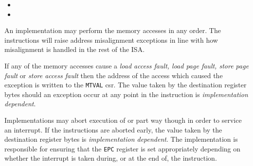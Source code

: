 \begin{minipage}{0.5\textwidth}
\begin{itemize}
\item {}
\item {}
\end{itemize}
\end{minipage}

\bigskip


An implementation may perform the memory accesses in any order. The instructions
will raise address misalignment exceptions in line with how misalignment is
handled in the rest of the ISA.

If any of the memory accesses cause
a {\em load access fault, load page fault, store page fault} or
{\em store access fault} then the address of the access which caused the
exception is written to the {\tt MTVAL} csr. The value taken by the
destination register bytes should an exception occur at any point in the
instruction is {\em implementation dependent}.

Implementations may abort execution of  or  part way
though in order to service an interrupt. If the instructions are aborted
early, the value taken by the destination register bytes is {\em
implementation dependent}. The implementation is responsible for ensuring
that the {\tt EPC} register is set appropriately depending on whether the
interrupt is taken during, or at the end of, the instruction.

